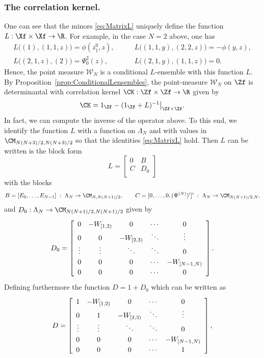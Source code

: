\documentclass[]{pcmi}
\theoremstyle{plain}
\theoremstyle{definition}
\begin{document}
\subsubsection*{The correlation kernel.} One can see that the minors \eqref{eq:MatrixL} uniquely define the function $L : \Xf \times \Xf \to \R$. For example, in the case $N=2$ above, one has
\begin{align*}
 L\big((1), (1,1, z)\big) = \phi(z_{1}^0, z), &\qquad L\big((1,1,y), (2,2, z)\big) = -\phi(y,z),\\
 L\big((2,1, z), (2)\big) = \Psi^2_{0}(z), &\qquad L\big((2,1, y), (1,1, z)\big) = 0.
\end{align*}
Hence, the point measure $\mathcal{W}_N$ is a conditional $L$-ensemble with this function $L$. By Proposition~\ref{prop:ConditionalLensembles}, the point-measure $\mathcal{W}_N$ on $\Zf$ is determinantal with correlation kernel $\CK : \Zf \times \Zf \to \R$ given by
\begin{equation}\label{eq:KDef}
 \CK=1_\Zf-(1_\Zf+L)^{-1}\big|_{\Zf\times\Zf}.
\end{equation}
In fact, we can compute the inverse of the operator above. To this end, we identify the function $L$ with a function on $\Lambda_N$ and with values in $\CM_{N(N+3)/2, N(N+3)/2}$ so that the identities \eqref{eq:MatrixL} hold. Then $L$ can be written is the block form
\[
L=\left[
    \begin{array}{cc}
      0 & B \\
      C & D_0 \\
    \end{array}
  \right]
\]
with the blocks 
\[
 B=[E_0,\ldots,E_{N-1}] \;  : \; \Lambda_N \to \CM_{N, N(N+1)/ 2},\qquad  C=[0,\ldots,0, (\Psi^{(N)})']' \;:\; \Lambda_N \to \CM_{N(N+1)/ 2, N},
\]
and $D_0 : \Lambda_N \to \CM_{N(N+1)/ 2, N(N+1)/ 2}$ given by
\[
 D_0 = \arraycolsep=5pt\renewcommand\arraystretch{1.2}
\left[\begin{array}{ccccc}
0 & -W_{[1,2)} & 0 & \cdots & 0 \\
0 & 0 & -W_{[2,3)} & \ddots & \vdots \\
 \vdots & \vdots & \ddots & \ddots &0    \\
0 & 0 & 0 &\cdots & -W_{[N-1,N)} \\
 0 & 0 & 0 & \cdots & 0
\end{array}
\right].
\]
Defining furthermore the function $D=1 + D_0$ which can be written as
\[
 D = \arraycolsep=5pt\renewcommand\arraystretch{1.2}
\left[\begin{array}{ccccc}
1 & -W_{[1,2)} & 0 & \cdots & 0 \\
0 & 1 & -W_{[2,3)} & \ddots & \vdots \\
 \vdots & \vdots & \ddots & \ddots &0    \\
0 & 0 & 0 &\cdots & -W_{[N-1,N)} \\
 0 & 0 & 0 & \cdots & 1
\end{array}
\right],
\]
\end{document}
